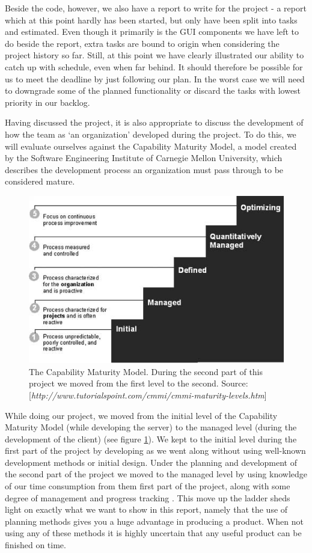 Beside the code, however, we also have a report to write for the project - a report which at this point hardly has been started, but only have been split into tasks and estimated.
Even though it primarily is the GUI components we have left to do beside the report, extra tasks are bound to origin when considering the project history so far. Still, at this point we have clearly illustrated our ability to catch up with schedule, even when far behind.
It should therefore be possible for us to meet the deadline by just following our plan. In the worst case we will need to downgrade some of the planned functionality or discard the tasks with lowest priority in our backlog.

Having discussed the project, it is also appropriate to discuss the development of how the team as `an organization' developed during the project. To do this, we will evaluate ourselves against the Capability Maturity Model, a model created by the Software Engineering Institute of Carnegie Mellon University, which describes the development process an organization must pass through to be considered mature.

\begin{figure}[t]
  \includegraphics[width=\textwidth]{illustrations/CMM.jpg}
  \caption{The Capability Maturity Model. During the second part of this project we moved from the first level to the second. Source: [\textit{http://www.tutorialspoint.com/cmmi/cmmi-maturity-levels.htm}]}
  \label{fig:Capability_Maturity_Model}
\end{figure}

While doing our project, we moved from the initial level of the Capability Maturity Model (while developing the server) to the managed level (during the development of the client) (see figure \ref{fig:Capability_Maturity_Model}). We kept to the initial level during the first part of the project by developing as we went along without using well-known development methods or initial design. Under the planning and development of the second part of the project we moved to the managed level by using knowledge of our time consumption from them first part of the project, along with some degree of management and progress tracking \cite[p. 242]{PM}. This move up the ladder sheds light on exactly what we want to show in this report, namely that the use of planning methods gives you a huge advantage in producing a product. When not using any of these methods it is highly uncertain that any useful product can be finished on time.
\newpage